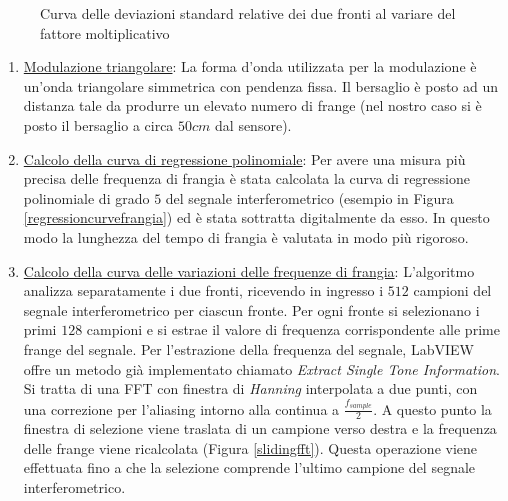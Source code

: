 \begin{figure}
\centering
{}
\hspace{5mm}
\caption{Curva delle deviazioni standard relative dei due fronti al variare del fattore moltiplicativo}\label{mulfact}
\end{figure}

\begin{enumerate}
	\item \underline{Modulazione triangolare}: La forma d'onda utilizzata per la modulazione è un'onda triangolare simmetrica con pendenza fissa. Il bersaglio è posto ad un distanza tale da produrre un elevato numero di frange (nel nostro caso si è posto il bersaglio a circa $50cm$ dal sensore).
	\item \underline{Calcolo della curva di regressione polinomiale}: Per avere una misura più precisa delle frequenza di frangia è stata calcolata la curva di regressione polinomiale di grado $5$ del segnale interferometrico (esempio in Figura \ref{regressioncurvefrangia}) ed è stata sottratta digitalmente da esso. In questo modo la lunghezza del tempo di frangia è valutata in modo più rigoroso.
	\item \underline{Calcolo della curva delle variazioni delle frequenze di frangia}: L'algoritmo analizza separatamente i due fronti, ricevendo in ingresso i $512$ campioni del segnale interferometrico per ciascun fronte. Per ogni fronte si selezionano i primi $128$ campioni e si estrae il valore di frequenza corrispondente alle prime frange del segnale. Per l'estrazione della frequenza del segnale, LabVIEW offre un metodo già implementato chiamato \textit{Extract Single Tone Information}. Si tratta di una FFT con finestra di \textit{Hanning} interpolata a due punti, con una correzione per l'aliasing intorno alla continua a $\frac{f_{sample}}{2}$. A questo punto la finestra di selezione viene traslata di un campione verso destra e la frequenza delle frange viene ricalcolata (Figura \ref{slidingfft}). Questa operazione viene effettuata fino a che la selezione comprende l'ultimo campione del segnale interferometrico.
	

\end{enumerate}
